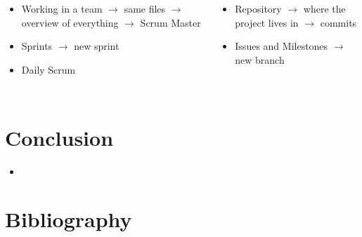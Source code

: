 \documentclass{beamer}
\begin{document}
\begin{frame}
	\begin{columns}
	    \center {}
	    \begin{itemize}
	    \item<1-> Working in a team \linebreak
	    $\rightarrow$ same files \linebreak
	    $\rightarrow$ overview of everything \linebreak
	    $\rightarrow$ Scrum Master
	    \item<3-> Sprints \linebreak
	    $\rightarrow$ new sprint
	    \item<5-> Daily Scrum
	    \end{itemize}
	    
	    \center {}
	    \begin{itemize}
	    \item<2-> Repository \linebreak
	    $\rightarrow$ where the project lives in \linebreak
	    $\rightarrow$ commits \linebreak
	    \item<4-> Issues and Milestones \linebreak
	    $\rightarrow$ new branch \linebreak
	    \end{itemize}
	    \end{columns}
	    \medskip
\end{frame}


\section{Conclusion}

\begin{frame}
	\begin{itemize}
		\item 
	\end{itemize}
\end{frame}


\section{Bibliography}
\end{document}
